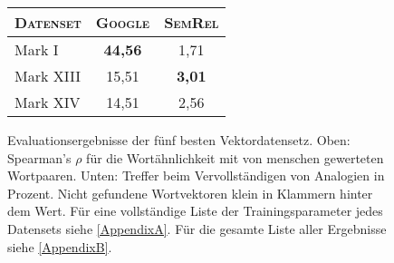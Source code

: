   \begin{figure}[h]
    \centering


    \vspace{0.5cm}

    \begin{tabular}{l||c|c}
      \textsc{Datenset} & \textsc{Google} & \textsc{SemRel} \\
      \hline
      Mark I & \textbf{44,56}  & 1,71 \\
      Mark XIII & 15,51 & \textbf{3,01} \\
      Mark XIV & 14,51 & 2,56 \\
    \end{tabular}

    \caption[Evaluationsergebnisse der besten Vektordatensets]{Evaluationsergebnisse der fünf besten Vektordatensetz. Oben:
    Spearman's $\rho$ für die Wortähnlichkeit mit von menschen gewerteten Wortpaaren. Unten: Treffer beim Vervollständigen
    von Analogien in Prozent. Nicht gefundene Wortvektoren klein in Klammern hinter dem Wert. Für eine vollständige Liste
    der Trainingsparameter jedes Datensets siehe \ref{AppendixA}. Für die gesamte Liste aller Ergebnisse siehe \ref{AppendixB}.}
  \end{figure}

